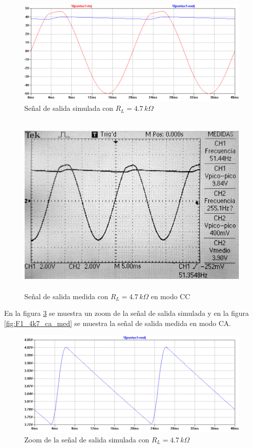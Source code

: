 \documentclass[10pt,spanish,a4paper,openany,notitlepage]{article}
\begin{document}
\begin{enumerate}
    \begin{figure}[H]
    \centering
    \includegraphics[scale=0.65]{simulaciones/F1_vo_RL-4k7.png}
    \caption{Señal de salida simulada con $R_L = 4.7\,\unit{k\Omega}$}
    \label{fig:F1_4k7_cc_sim}
    \end{figure}
    
    \begin{figure}[H]
    \centering
    \includegraphics[width=350pt, height=250pt]{mediciones/F1-4K7.jpg}
    \caption{Señal de salida medida con $R_L = 4.7\,\unit{k\Omega}$ en modo CC}
    \label{fig:F1_4k7_cc_med}
    \end{figure}
    
    En la figura \ref{fig:F1_4k7_ca_sim} se muestra un zoom de la señal de salida simulada y en
    la figura \ref{fig:F1_4k7_ca_med} se muestra la señal de salida medida en modo CA.
    
    \begin{figure}[H]
    \centering
    \includegraphics[scale=0.65]{simulaciones/F1_vo_RL-4k7_zoom.png}
    \caption{Zoom de la señal de salida simulada con $R_L = 4.7\,\unit{k\Omega}$}
    \label{fig:F1_4k7_ca_sim}
    \end{figure}
    

\end{enumerate}
\end{document}

